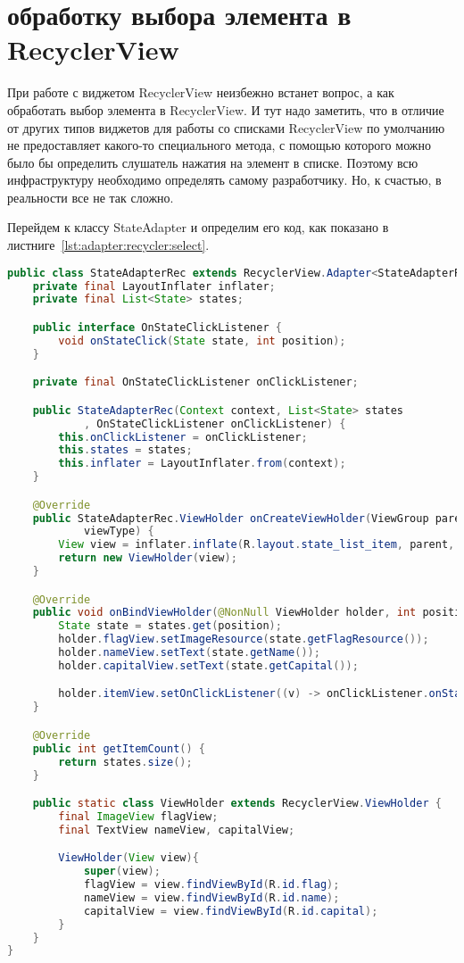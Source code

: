 \section{обработку выбора элемента в RecyclerView}
При работе с виджетом RecyclerView неизбежно встанет вопрос, а как
обработать выбор элемента в RecyclerView. И тут надо заметить, что в
отличие от других типов виджетов для работы со списками RecyclerView по
умолчанию не предоставляет какого-то специального метода, с помощью
которого можно было бы определить слушатель нажатия на элемент в
списке. Поэтому всю инфраструктуру необходимо определять самому
разработчику. Но, к счастью, в реальности все не так сложно.\par
Перейдем к классу StateAdapter и определим его код, как
показано в листниге~\ref{lst:adapter:recycler:select}.

\begin{lstlisting}[language=Java
	, label=lst:adapter:recycler:select
	]
public class StateAdapterRec extends RecyclerView.Adapter<StateAdapterRec.ViewHolder>{
	private final LayoutInflater inflater;
	private final List<State> states;

	public interface OnStateClickListener {
		void onStateClick(State state, int position);
	}

	private final OnStateClickListener onClickListener;

	public StateAdapterRec(Context context, List<State> states
			, OnStateClickListener onClickListener) {
		this.onClickListener = onClickListener;
		this.states = states;
		this.inflater = LayoutInflater.from(context);
	}

	@Override
	public StateAdapterRec.ViewHolder onCreateViewHolder(ViewGroup parent, int
			viewType) {
		View view = inflater.inflate(R.layout.state_list_item, parent, false);
		return new ViewHolder(view);
	}

	@Override
	public void onBindViewHolder(@NonNull ViewHolder holder, int position) {
		State state = states.get(position);
		holder.flagView.setImageResource(state.getFlagResource());
		holder.nameView.setText(state.getName());
		holder.capitalView.setText(state.getCapital());

		holder.itemView.setOnClickListener((v) -> onClickListener.onStateClick(state, position));
	}

	@Override
	public int getItemCount() {
		return states.size();
	}

	public static class ViewHolder extends RecyclerView.ViewHolder {
		final ImageView flagView;
		final TextView nameView, capitalView;

		ViewHolder(View view){
			super(view);
			flagView = view.findViewById(R.id.flag);
			nameView = view.findViewById(R.id.name);
			capitalView = view.findViewById(R.id.capital);
		}
	}
}
\end{lstlisting}

